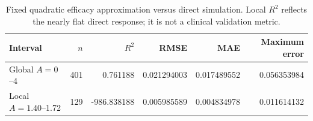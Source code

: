 \begin{table}[htbp]\centering
\caption{Fixed quadratic efficacy approximation versus direct simulation. Local $R^2$ reflects the nearly flat direct response; it is not a clinical validation metric.}\label{tab:model}
\small
\setlength{\tabcolsep}{4pt}
\begin{tabular}{lrrrrr}\toprule
Interval & $n$ & $R^2$ & RMSE & MAE & Maximum error \\ \midrule
Global $A=0$--4 & 401 & 0.761188 & 0.021294003 & 0.017489552 & 0.056353984 \\
Local $A=1.40$--1.72 & 129 & -986.838188 & 0.005985589 & 0.004834978 & 0.011614132 \\
\bottomrule\end{tabular}
\end{table}
